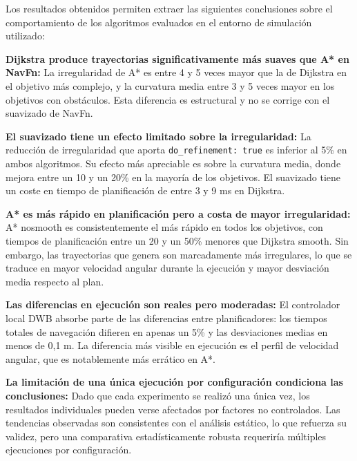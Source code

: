 Los resultados obtenidos permiten extraer las siguientes conclusiones sobre el comportamiento de los algoritmos evaluados en el entorno de simulación utilizado:

\textbf{Dijkstra produce trayectorias significativamente más suaves que A* en NavFn:} La irregularidad de A* es entre 4 y 5 veces mayor que la de Dijkstra en el objetivo más complejo, y la curvatura media entre 3 y 5 veces mayor en los objetivos con obstáculos. Esta diferencia es estructural y no se corrige con el suavizado de NavFn.

\textbf{El suavizado tiene un efecto limitado sobre la irregularidad:} La reducción de irregularidad que aporta \texttt{do\_refinement: true} es inferior al 5\% en ambos algoritmos. Su efecto más apreciable es sobre la curvatura media, donde mejora entre un 10 y un 20\% en la mayoría de los objetivos. El suavizado tiene un coste en tiempo de planificación de entre 3 y 9 ms en Dijkstra.

\textbf{A* es más rápido en planificación pero a costa de mayor irregularidad:} A* nosmooth es consistentemente el más rápido en todos los objetivos, con tiempos de planificación entre un 20 y un 50\% menores que Dijkstra smooth. Sin embargo, las trayectorias que genera son marcadamente más irregulares, lo que se traduce en mayor velocidad angular durante la ejecución y mayor desviación media respecto al plan.

\textbf{Las diferencias en ejecución son reales pero moderadas:} El controlador local DWB absorbe parte de las diferencias entre planificadores: los tiempos totales de navegación difieren en apenas un 5\% y las desviaciones medias en menos de 0,1 m. La diferencia más visible en ejecución es el perfil de velocidad angular, que es notablemente más errático en A*.

\textbf{La limitación de una única ejecución por configuración condiciona las conclusiones:} Dado que cada experimento se realizó una única vez, los resultados individuales pueden verse afectados por factores no controlados. Las tendencias observadas son consistentes con el análisis estático, lo que refuerza su validez, pero una comparativa estadísticamente robusta requeriría múltiples ejecuciones por configuración.
